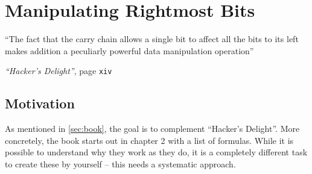 \section{Manipulating Rightmost Bits}\label{sec:rightmost}
\epigraph{
``The fact that the carry chain allows a single bit
to affect all the bits to its left
makes addition a peculiarly powerful data manipulation operation''
}{
\emph{``Hacker's Delight''}, page \texttt{xiv}
\cite{Warren:2012:HD:2462741}
}


\subsection*{Motivation}
As mentioned in \autoref{sec:book},
the goal is to complement ``Hacker's Delight''.
More concretely, the book starts out in chapter 2 with a list of formulas.
While it is possible to understand why they work as they do,
it is a completely different task to create these by yourself
-- this needs a systematic approach.
